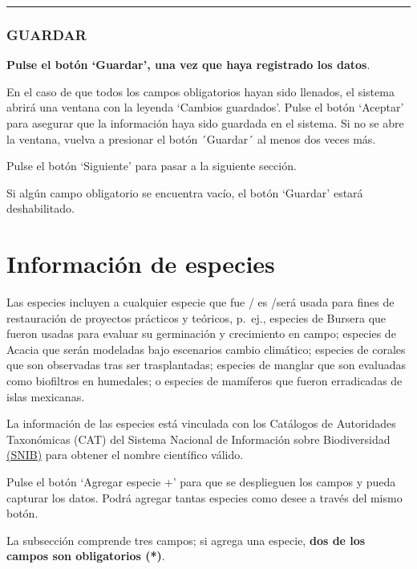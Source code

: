 \documentclass[
]{book}
\begin{document}
\begin{center}\rule{0.5\linewidth}{0.5pt}\end{center}

\hypertarget{guardar-5}{%
\subsection*{GUARDAR}\label{guardar-5}}

\textbf{Pulse el botón `Guardar', una vez que haya registrado los datos}.

En el caso de que todos los campos obligatorios hayan sido llenados, el sistema abrirá una ventana con la leyenda `Cambios guardados'. Pulse el botón `Aceptar' para asegurar que la información haya sido guardada en el sistema. Si no se abre la ventana, vuelva a presionar el botón ´Guardar´ al menos dos veces más.

Pulse el botón `Siguiente' para pasar a la siguiente sección.

Si algún campo obligatorio se encuentra vacío, el botón `Guardar' estará deshabilitado.

\hypertarget{informaciuxf3n-de-especies}{%
\chapter*{Información de especies}\label{informaciuxf3n-de-especies}}

Las especies incluyen a cualquier especie que fue / es /será usada para fines de restauración de proyectos prácticos y teóricos, p.~ej., especies de Bursera que fueron usadas para evaluar su germinación y crecimiento en campo; especies de Acacia que serán modeladas bajo escenarios cambio climático; especies de corales que son observadas tras ser trasplantadas; especies de manglar que son evaluadas como biofiltros en humedales; o especies de mamíferos que fueron erradicadas de islas mexicanas.

La información de las especies está vinculada con los Catálogos de Autoridades Taxonómicas (CAT) del Sistema Nacional de Información sobre Biodiversidad \href{www.snib.mx}{(SNIB)} para obtener el nombre científico válido.

Pulse el botón `Agregar especie +' para que se desplieguen los campos y pueda capturar los datos. Podrá agregar tantas especies como desee a través del mismo botón.

La subsección comprende tres campos; si agrega una especie, \textbf{dos de los campos son obligatorios ({*})}.
\end{document}
